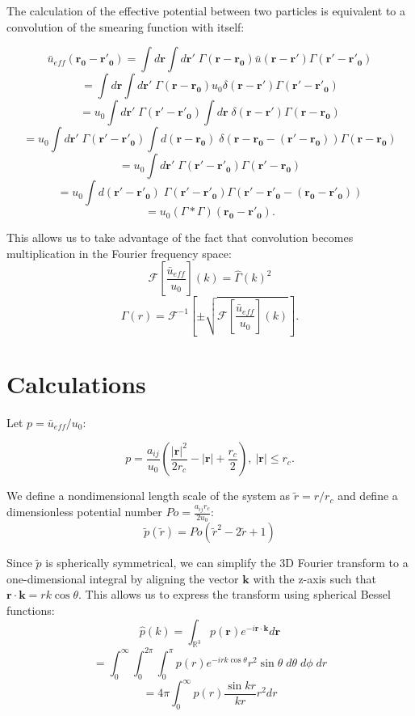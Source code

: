 \documentclass{article}
\begin{document}
The calculation of the effective potential between two particles is equivalent to a convolution of the smearing function with itself:

\[\bar{u}_{eff}(\mathbf{r_0}-\mathbf{r'_0}) = \int d\mathbf{r}\int d\mathbf{r'} \; \Gamma(\mathbf{r}-\mathbf{r_0}) \bar{u}(\mathbf{r}-\mathbf{r'}) \Gamma(\mathbf{r'}-\mathbf{r'_0})\]
\[= \int d\mathbf{r}\int d\mathbf{r'} \; \Gamma(\mathbf{r}-\mathbf{r_0}) u_0 \delta(\mathbf{r}-\mathbf{r'}) \Gamma(\mathbf{r'}-\mathbf{r'_0})\]
\[= u_0 \int d\mathbf{r'} \;   \Gamma(\mathbf{r'}-\mathbf{r'_0}) \int d\mathbf{r} \; \delta(\mathbf{r}-\mathbf{r'})\Gamma(\mathbf{r}-\mathbf{r_0})\]
\[= u_0 \int d\mathbf{r'} \;   \Gamma(\mathbf{r'}-\mathbf{r'_0}) \int d(\mathbf{r}-\mathbf{r_0}) \; \delta(\mathbf{r}-\mathbf{r_0} -(\mathbf{r'} - \mathbf{r_0}))\Gamma(\mathbf{r}-\mathbf{r_0})\]
\[= u_0 \int d\mathbf{r'} \;   \Gamma(\mathbf{r'}-\mathbf{r'_0}) \Gamma(\mathbf{r}'-\mathbf{r_0})\]
\[= u_0 \int d(\mathbf{r'} - \mathbf{r'_0}) \;   \Gamma(\mathbf{r'}-\mathbf{r'_0}) \Gamma(\mathbf{r}'-\mathbf{r'_0} - (\mathbf{r_0} - \mathbf{r'_0}))\]
\[ = u_0 (\Gamma *\Gamma)(\mathbf{r_0} - \mathbf{r'_0}).\]

This allows us to take advantage of the fact that convolution becomes multiplication in the Fourier frequency space:
\[ \mathcal{F}\left[\frac {\bar{u}_{eff}}{u_0} \right] (k) = \hat{\Gamma}(k)^2 \]
\[\Gamma (r) = \mathcal{F}^{-1} \left[ \pm \sqrt{\mathcal{F}\left[\frac {\bar{u}_{eff}}{u_0} \right] (k)} \right].\]

\section{Calculations}
Let \(p = \bar{u}_{eff}/u_0\):

\[p = \frac{a_{ij}}{u_0} \left(\frac{|\mathbf{r}|^2}{2r_c} - |\mathbf{r}| + \frac{r_c}{2}\right), \: |\mathbf{r}| \leq r_c.\]

We define a nondimensional length scale of the system as \( \tilde r = r / r_c\) and define a dimensionless potential number \(Po = \frac{a_{ij}r_c}{2 u_0}\):
\[\tilde{p}(\tilde{r}) = Po (\tilde{r}^2 - 2\tilde{r} + 1)\]

Since \(\tilde{p}\) is spherically symmetrical, we can simplify the 3D Fourier transform to a one-dimensional integral by aligning the vector \(\mathbf{k}\) with the z-axis such that \(\mathbf{r \cdot k} = rk \cos{\theta}\). This allows us to express the transform using spherical Bessel functions:
\[\hat{p}(k) = \int_{ \mathbb{R}^3} p(\mathbf{r}) e^{-i \mathbf{r \cdot k}} d\mathbf{r}\]
\[= \int_0^\infty \int_0^{2\pi} \int_0^\pi p(r) e^{-i rk \cos{\theta}} r^2\sin{\theta} \; d\theta \; d\phi \; dr\]
\[= 4 \pi \int_0^\infty p(r) \frac{\sin{kr}}{kr} r^2 dr\]
\end{document}
